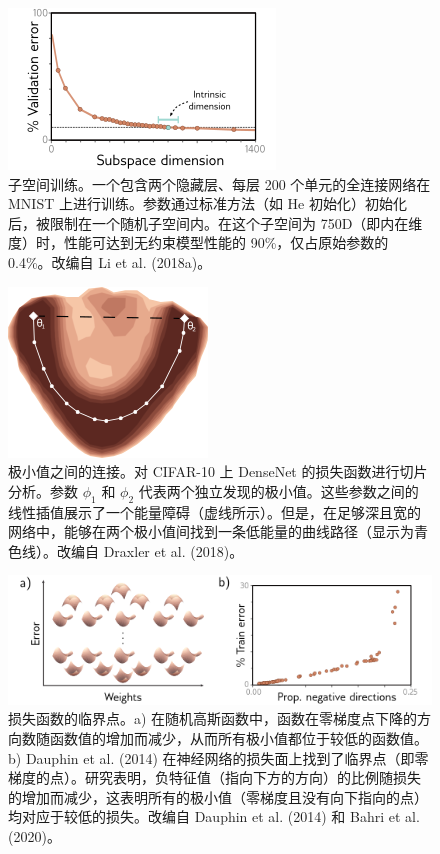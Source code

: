 \begin{figure}[ht!]
\centering
\includegraphics[width=0.7\linewidth]{png/chapter20/WhySubspace.png}
\caption{子空间训练。一个包含两个隐藏层、每层 200 个单元的全连接网络在 MNIST 上进行训练。参数通过标准方法（如 He 初始化）初始化后，被限制在一个随机子空间内。在这个子空间为 750D（即内在维度）时，性能可达到无约束模型性能的 90\%，仅占原始参数的 0.4\%。改编自 Li et al. (2018a)。}
\end{figure}


\begin{figure}[ht!]
\centering
\includegraphics[width=0.7\linewidth]{png/chapter20/WhyDraxler.png}
\caption{极小值之间的连接。对 CIFAR-10 上 DenseNet 的损失函数进行切片分析。参数 \(\phi_1\) 和 \(\phi_2\) 代表两个独立发现的极小值。这些参数之间的线性插值展示了一个能量障碍（虚线所示）。但是，在足够深且宽的网络中，能够在两个极小值间找到一条低能量的曲线路径（显示为青色线）。改编自 Draxler et al. (2018)。}
\end{figure}


\begin{figure}[ht!]
\centering
\includegraphics[width=0.7\linewidth]{png/chapter20/WhyDauphin.png}
\caption{损失函数的临界点。a) 在随机高斯函数中，函数在零梯度点下降的方向数随函数值的增加而减少，从而所有极小值都位于较低的函数值。b) Dauphin et al. (2014) 在神经网络的损失面上找到了临界点（即零梯度的点）。研究表明，负特征值（指向下方的方向）的比例随损失的增加而减少，这表明所有的极小值（零梯度且没有向下指向的点）均对应于较低的损失。改编自 Dauphin et al. (2014) 和 Bahri et al. (2020)。}
\end{figure}


